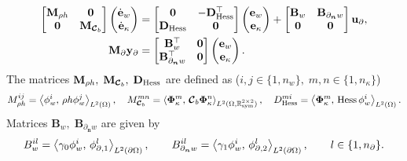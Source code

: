 \begin{equation}
\begin{aligned}
\begin{bmatrix}
\mathbf{M}_{\rho h} & \mathbf{0} \\
\mathbf{0} & \mathbf{M}_{\bm{\mathcal{C}}_b} \\
\end{bmatrix}
\begin{pmatrix}
\dot{\mathbf{e}}_{w} \\
\dot{\mathbf{e}}_{\kappa} \\
\end{pmatrix}
&= \begin{bmatrix}
\mathbf{0} & -\mathbf{D}_{\Hess}^\top \\
\mathbf{D}_{\Hess} & \mathbf{0} \\
\end{bmatrix} 
\begin{pmatrix}
\mathbf{e}_{w} \\
\mathbf{e}_{\kappa} \\
\end{pmatrix} + 
\begin{bmatrix}
\mathbf{B}_w & \mathbf{B}_{\partial_{\bm{n}} w}\\
\mathbf{0} & \mathbf{0}\\
\end{bmatrix}
\mathbf{u}_\partial, \\
\mathbf{M}_\partial {\mathbf{y}_\partial} &= \begin{bmatrix}
\mathbf{B}_w^\top & \mathbf{0} \\
\mathbf{B}_{\partial_{\bm{n}} w}^\top & \mathbf{0} \\
\end{bmatrix}\begin{pmatrix}
\mathbf{e}_{w} \\
\mathbf{e}_{\kappa} \\
\end{pmatrix}.
\end{aligned}
\end{equation}
The matrices $\mathbf{M}_{\rho h}, \; \mathbf{M}_{\bm{\mathcal{C}}_b}, \; 
\mathbf{D}_{\Hess}$ are defined as ($i, j \in \{1, n_w\}, \; m, n \in \{1, n_\kappa\}$)
\begin{equation}
M_{\rho h}^{ij} = \inner[L^2(\Omega)]{\phi_w^i}{\rho h \phi_w^j}, \quad
M_{\bm{\mathcal{C}}_b}^{mn} = \inner[L^2(\Omega, \mathbb{R}^{2\times 2}_{\text{sym}})]{\bm\Phi_\kappa^m}{\bm{\mathcal{C}}_b \bm\Phi_\kappa^n}, \quad D_{\Hess}^{mi} = \inner[L^2(\Omega)]{\bm\Phi_\kappa^m}{\Hess \phi_w^i}.
\end{equation}
Matrices $\mathbf{B}_w, \; \mathbf{B}_{\partial_{\bm{n}} w}$ are given by
\begin{equation}
{B}_w^{il} = \inner[L^2(\partial\Omega)]{\gamma_0 \phi_w^i}{\phi_{\partial, 1}^l}, \qquad {B}_{\partial_{\bm{n}} w}^{il} = \inner[L^2(\partial\Omega)]{\gamma_1 \phi_w^i}{\phi_{\partial, 2}^l}, \qquad l \in \{1, n_\partial\}.
\end{equation}

